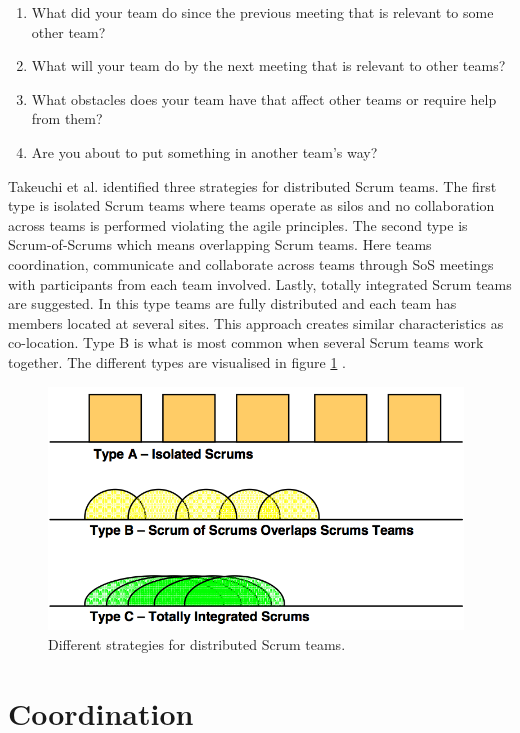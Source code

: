 \begin{enumerate}
  \item What did your team do since the previous meeting that is relevant to some other team?
  \item What will your team do by the next meeting that is relevant to other teams?
  \item What obstacles does your team have that affect other teams or require help from them?
  \item Are you about to put something in another team's way?
\end{enumerate}

Takeuchi et al. identified three strategies for distributed Scrum teams. The first type is isolated Scrum teams where teams operate as silos and no collaboration across teams is performed violating the agile principles. The second type is Scrum-of-Scrums which means overlapping Scrum teams. Here teams coordination, communicate and collaborate across teams through SoS meetings with participants from each team involved. Lastly, totally integrated Scrum teams are suggested. In this type teams are fully distributed and each team has members located at several sites. This approach creates similar characteristics as co-location. Type B is what is most common when several Scrum teams work together. The different types are visualised in figure \ref{distributedscrum} \cite{takeuchi2004}.

\begin{figure}[ht!]
\centering
\includegraphics[width=110mm]{images/distributed_scrum.png}
\caption{Different strategies for distributed Scrum teams.}
\label{distributedscrum}
\end{figure}

\section{Coordination}

